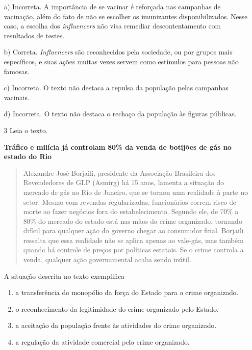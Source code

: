 a) Incorreta. A importância de se vacinar é reforçada nas campanhas de
vacinação, além do fato de não se escolher os imunizantes
disponibilizados. Nesse caso, a escolha dos \emph{influencers} não visa
remediar descontentamento com resultados de testes.

b) Correta. \emph{Influencers} são reconhecidos pela sociedade, ou por
grupos mais específicos, e suas ações muitas vezes servem como estímulos
para pessoas não famosas.

c) Incorreta. O texto não destaca a repulsa da população pelas campanhas
vacinais.

d) Incorreta. O texto não destaca o rechaço da população às figuras
públicas.

\num{3} Leia o texto.

\textbf{Tráfico e milícia já controlam 80\% da venda de botijões de gás no estado do Rio}

\begin{quote}
Alexandre José Borjaili, presidente da Associação Brasileira dos
Revendedores de GLP (Asmirg) há 15 anos, lamenta a situação do mercado
de gás no Rio de Janeiro, que se tornou uma realidade à parte no setor.
Mesmo com revendas regularizadas, funcionários correm risco de morte ao
fazer negócios fora do estabelecimento. Segundo ele, de 70\% a 80\% do
mercado do estado está nas mãos do crime organizado, tornando difícil
para qualquer ação do governo chegar ao consumidor final. Borjaili
ressalta que essa realidade não se aplica apenas ao vale-gás, mas também
quando há controle de preços por políticas estatais. Se o crime controla
a venda, qualquer ação governamental acaba sendo inútil.
\end{quote}


A situação descrita no texto exemplifica

\begin{enumerate}
\def\labelenumi{\alph{enumi})}
\item
  a transferência do monopólio da força do Estado para o crime
  organizado.
\item
  o reconhecimento da legitimidade do crime organizado pelo Estado.
\item
  a aceitação da população frente às atividades do crime organizado.
\item
  a regulação da atividade comercial pelo crime organizado.
\end{enumerate}

